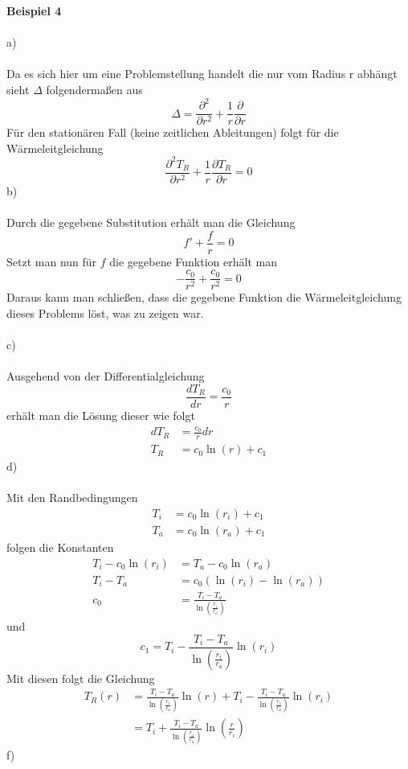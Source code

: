 \textbf{Beispiel 4} \\ \\
a) \\ \\
Da es sich hier um eine Problemstellung handelt die nur vom Radius r abhängt sieht $\Delta$ folgendermaßen aus
\[
	\Delta = \frac{\partial^2}{\partial r^2} + \frac{1}{r}\frac{\partial}{\partial r}
\]
Für den stationären Fall (keine zeitlichen Ableitungen) folgt für die Wärmeleitgleichung
\[
	\frac{\partial^2 T_R}{\partial r^2} + \frac{1}{r}\frac{\partial T_R}{\partial r} = 0
\]
b) \\ \\
Durch die gegebene Substitution erhält man die Gleichung
\[
	f' + \frac{f}{r} = 0
\]
Setzt man nun für $f$ die gegebene Funktion erhält man
\[
	-\frac{c_0}{r^2} + \frac{c_0}{r^2} = 0
\]
Daraus kann man schließen, dass die gegebene Funktion die Wärmeleitgleichung dieses Problems löst, was zu zeigen war. \\ \\
c) \\ \\
Ausgehend von der Differentialgleichung
\[
	\frac{dT_R}{dr} = \frac{c_0}{r}
\]
erhält man die Lösung dieser wie folgt
\begin{align*}
	dT_R &= \frac{c_0}{r}dr\\
	T_R &=  c_0\ln(r) + c_1
\end{align*}
d) \\ \\
Mit den Randbedingungen
\begin{align*}
	T_i &= c_0\ln(r_i) + c_1 \\
	T_a &= c_0\ln(r_a) + c_1
\end{align*}
folgen die Konstanten
\begin{align*}
	T_i - c_0\ln(r_i) &= T_a - c_0\ln(r_a) \\
	T_i - T_a &= c_0 ( \ln(r_i) - \ln(r_a)) \\
	c_0 &= \frac{T_i - T_a}{\ln(\frac{r_i}{r_a})}
\end{align*}
und
\[
	c_1 = T_i - \frac{T_i - T_a}{\ln(\frac{r_i}{r_a})}\ln(r_i)
\]
Mit diesen folgt die Gleichung 
\begin{align*}
	T_R(r) &= \frac{T_i - T_a}{\ln(\frac{r_i}{r_a})}\ln(r) + T_i - \frac{T_i - T_a}{\ln(\frac{r_i}{r_a})}\ln(r_i) \\
	&= T_i + \frac{T_i - T_a}{\ln(\frac{r_i}{r_a})}\ln(\frac{r}{r_i})
\end{align*}
f)\\ \\
